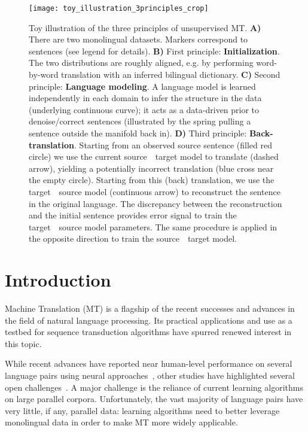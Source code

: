 \documentclass[11pt,a4paper]{article}
\begin{document}
\begin{figure*}[t!]
\texttt{[image: toy\_illustration\_3principles\_crop]}
\vspace{-0.8cm}
\caption{\small{Toy illustration of the three principles of unsupervised MT. \textbf{A)} There are two monolingual datasets. Markers correspond to sentences (see legend for details). \textbf{B)} First principle: \textbf{Initialization}. The two distributions are roughly aligned, e.g. by performing word-by-word translation with an inferred bilingual dictionary. \textbf{C)} Second principle: \textbf{Language modeling}. A language model is learned independently in each domain to infer the structure in the data (underlying continuous curve); it acts as a data-driven prior to denoise/correct sentences (illustrated by the spring pulling a sentence outside the manifold back in). \textbf{D)} Third principle: \textbf{Back-translation}. Starting from an observed source sentence (filled red circle) we use the current source~~target model to translate (dashed arrow), yielding a potentially incorrect translation (blue cross near the empty circle). Starting from this (back) translation, we use the target~~source model (continuous arrow) to reconstruct the sentence in the original language. The discrepancy between the reconstruction and the initial sentence provides error signal to train the target~~source model parameters. The same procedure is applied in the opposite direction to train the source~~target model.}}
\vspace{-0.3cm}
\label{fig:toy_illustration}
\end{figure*}

\section{Introduction} \label{sec:intro}
Machine Translation (MT) is a flagship of the recent successes and advances in the field of natural language processing.
Its practical applications and use as a testbed for sequence transduction algorithms have spurred renewed interest in this topic.

While recent advances have reported near human-level performance on several language pairs using neural approaches~\cite{wu2016google,msrMT18}, other studies have highlighted several open challenges~\cite{koehn17, isabelle17, senrich17}. A major challenge is the reliance of current learning algorithms on large parallel corpora. Unfortunately, the vast majority of language pairs have very little, if any, parallel data: learning algorithms need to better leverage monolingual data in order to make MT more widely applicable.
\end{document}
